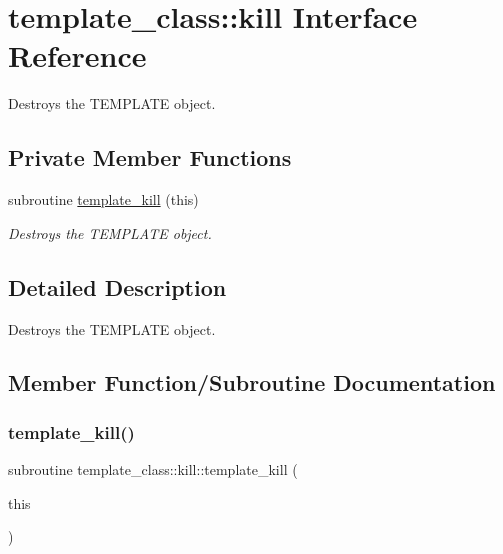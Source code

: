 \hypertarget{interfacetemplate__class_1_1kill}{}\section{template\+\_\+class\+:\+:kill Interface Reference}
\label{interfacetemplate__class_1_1kill}


Destroys the T\+E\+M\+P\+L\+A\+TE object.  


\subsection*{Private Member Functions}
\begin{DoxyCompactItemize}
\item 
subroutine \hyperlink{interfacetemplate__class_1_1kill_a4a87b430982dbc5743fbdc7d82bc1092}{template\+\_\+kill} (this)
\begin{DoxyCompactList}\small\item\em Destroys the T\+E\+M\+P\+L\+A\+TE object. \end{DoxyCompactList}\end{DoxyCompactItemize}


\subsection{Detailed Description}
Destroys the T\+E\+M\+P\+L\+A\+TE object. 

\subsection{Member Function/\+Subroutine Documentation}
\mbox{\label{interfacetemplate__class_1_1kill_a4a87b430982dbc5743fbdc7d82bc1092}} 
\subsubsection{\texorpdfstring{template\+\_\+kill()}{template\_kill()}}
{\footnotesize\ttfamily subroutine template\+\_\+class\+::kill\+::template\+\_\+kill (\begin{DoxyParamCaption}\item[{type(\hyperlink{structtemplate__class_1_1template}{template}), intent(inout)}]{this }\end{DoxyParamCaption})\hspace{0.3cm}{\ttfamily [private]}}



